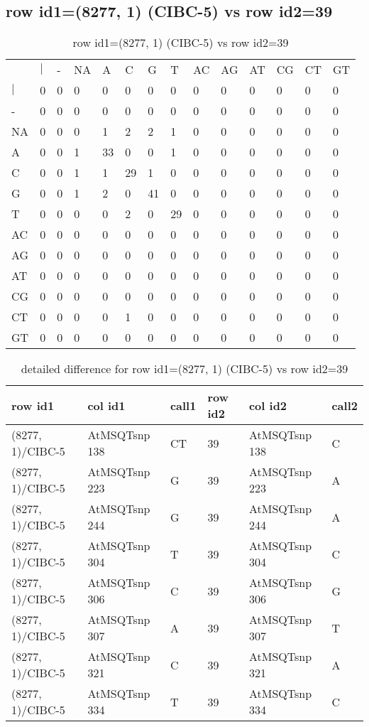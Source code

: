 \subsection{row id1=(8277, 1) (CIBC-5) vs row id2=39}
\begin{center}
\begin{longtable}{|l|l|l|l|l|l|l|l|l|l|l|l|l|l|}
\caption{row id1=(8277, 1) (CIBC-5) vs row id2=39} \label{table_dm432}\\
\hline
\\
\hline
&$|$&-&NA&A&C&G&T&AC&AG&AT&CG&CT&GT\\
$|$&0&0&0&0&0&0&0&0&0&0&0&0&0\\
-&0&0&0&0&0&0&0&0&0&0&0&0&0\\
NA&0&0&0&1&2&2&1&0&0&0&0&0&0\\
A&0&0&1&33&0&0&1&0&0&0&0&0&0\\
C&0&0&1&1&29&1&0&0&0&0&0&0&0\\
G&0&0&1&2&0&41&0&0&0&0&0&0&0\\
T&0&0&0&0&2&0&29&0&0&0&0&0&0\\
AC&0&0&0&0&0&0&0&0&0&0&0&0&0\\
AG&0&0&0&0&0&0&0&0&0&0&0&0&0\\
AT&0&0&0&0&0&0&0&0&0&0&0&0&0\\
CG&0&0&0&0&0&0&0&0&0&0&0&0&0\\
CT&0&0&0&0&1&0&0&0&0&0&0&0&0\\
GT&0&0&0&0&0&0&0&0&0&0&0&0&0\\
\hline
\end{longtable}
\end{center}

\begin{center}
\begin{longtable}{|l|l|l|l|l|l|}
\caption{detailed difference for row id1=(8277, 1) (CIBC-5) vs row id2=39} \label{table_dm433}\\
\hline
row id1&col id1&call1&row id2&col id2&call2\\
\hline
(8277, 1)/CIBC-5&AtMSQTsnp 138&CT&39&AtMSQTsnp 138&C\\
(8277, 1)/CIBC-5&AtMSQTsnp 223&G&39&AtMSQTsnp 223&A\\
(8277, 1)/CIBC-5&AtMSQTsnp 244&G&39&AtMSQTsnp 244&A\\
(8277, 1)/CIBC-5&AtMSQTsnp 304&T&39&AtMSQTsnp 304&C\\
(8277, 1)/CIBC-5&AtMSQTsnp 306&C&39&AtMSQTsnp 306&G\\
(8277, 1)/CIBC-5&AtMSQTsnp 307&A&39&AtMSQTsnp 307&T\\
(8277, 1)/CIBC-5&AtMSQTsnp 321&C&39&AtMSQTsnp 321&A\\
(8277, 1)/CIBC-5&AtMSQTsnp 334&T&39&AtMSQTsnp 334&C\\
\hline
\end{longtable}
\end{center}

